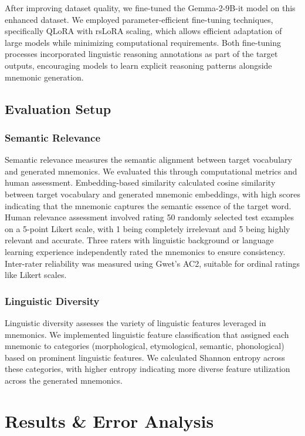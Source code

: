 \documentclass{article}
\newcounter{para}
\begin{document}
After improving dataset quality, we fine-tuned the Gemma-2-9B-it model on this enhanced dataset. We employed parameter-efficient fine-tuning techniques, specifically QLoRA with rsLoRA scaling, which allows efficient adaptation of large models while minimizing computational requirements. Both fine-tuning processes incorporated linguistic reasoning annotations as part of the target outputs, encouraging models to learn explicit reasoning patterns alongside mnemonic generation.

\subsection{Evaluation Setup} \label{sec:evaluation-metrics}
\subsubsection{Semantic Relevance} \label{sec:relevance-eval}
Semantic relevance measures the semantic alignment between target vocabulary and generated mnemonics. We evaluated this through computational metrics and human assessment. Embedding-based similarity calculated cosine similarity between target vocabulary and generated mnemonic embeddings, with high scores indicating that the mnemonic captures the semantic essence of the target word. Human relevance assessment involved rating 50 randomly selected test examples on a 5-point Likert scale, with 1 being completely irrelevant and 5 being highly relevant and accurate. Three raters with linguistic background or language learning experience independently rated the mnemonics to ensure consistency. Inter-rater reliability was measured using Gwet's AC2, suitable for ordinal ratings like Likert scales.

\subsubsection{Linguistic Diversity} \label{sec:diversity-eval}
Linguistic diversity assesses the variety of linguistic features leveraged in mnemonics. We implemented linguistic feature classification that assigned each mnemonic to categories (morphological, etymological, semantic, phonological) based on prominent linguistic features. We calculated Shannon entropy across these categories, with higher entropy indicating more diverse feature utilization across the generated mnemonics.

\section{Results \& Error Analysis} \label{sec:results}
\end{document}
